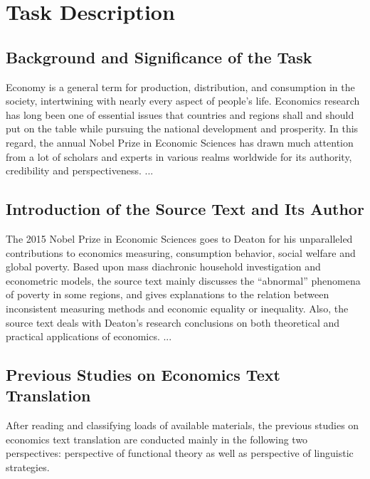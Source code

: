 \chapter{Task Description}
\section{Background and Significance of the Task}
	Economy is a general term for production, distribution, and consumption in the society, intertwining with nearly every aspect of people’s life. Economics research has long been one of essential issues that countries and regions shall and should put on the table while pursuing the national development and prosperity. In this regard, the annual Nobel Prize in Economic Sciences has drawn much attention from a lot of scholars and experts in various realms worldwide for its authority, credibility and perspectiveness.
	...
\section{Introduction of the Source Text and Its Author}
	The 2015 Nobel Prize in Economic Sciences goes to Deaton for his unparalleled contributions to economics measuring, consumption behavior, social welfare and global poverty. Based upon mass diachronic household investigation and econometric models, the source text mainly discusses the “abnormal” phenomena of poverty in some regions, and gives explanations to the relation between inconsistent measuring methods and economic equality or inequality. Also, the source text deals with Deaton’s research conclusions on both theoretical and practical applications of economics.
	...

\section{Previous Studies on Economics Text Translation}
	After reading and classifying loads of available materials, the previous studies on economics text translation are conducted mainly in the following two perspectives: perspective of functional theory as well as perspective of linguistic strategies.
